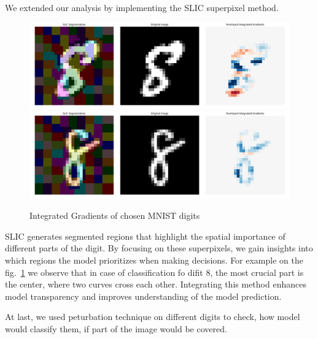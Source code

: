 \documentclass[journal, a4paper]{IEEEtran}
\begin{document}
We extended our analysis by implementing the SLIC superpixel method.

\begin{figure}[h]\centering
    \includegraphics[width=.6\linewidth]{img/SLIC/mnist/8}
    \includegraphics[width=.6\linewidth]{img/SLIC/mnist/8_1}
    \caption{Integrated Gradients of chosen MNIST digits}\label{fig:mnist-cnn-slic}
\end{figure}

SLIC generates segmented regions that highlight the spatial importance of different parts of the digit.
By focusing on these superpixels, we gain insights into which regions the model prioritizes when making decisions.
For example on the fig.~\ref{fig:mnist-cnn-slic} we observe that in case of classification fo difit 8, the most crucial part is the center, where two curves cross each other.
Integrating this method enhances model transparency and improves understanding of the model prediction.

At last, we used peturbation technique on different digits to check, how model would classify them, if part of the image would be covered.
\end{document}
